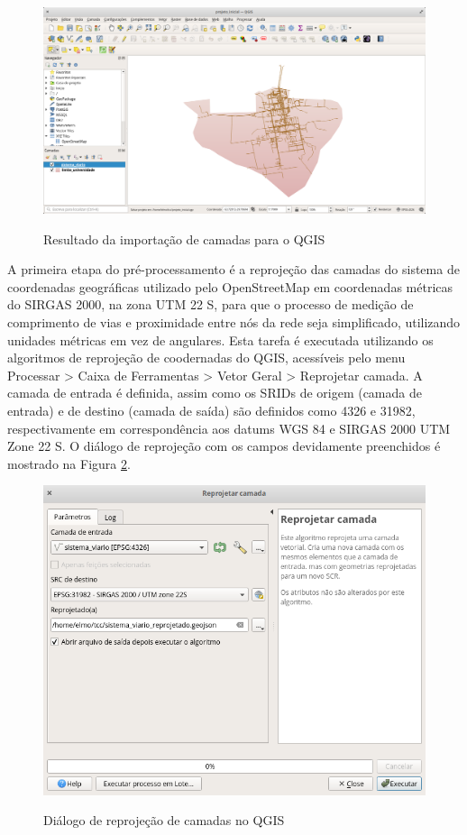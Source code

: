 \documentclass[oneside,openright,12pt]{ufsm_2015} %
\begin{document}
\begin{figure}[h]
    \caption{Resultado da importação de camadas para o QGIS}
    \centering
    \includegraphics[scale=0.3]{imagens/camadas_importadas_qgis.png}
    \label{camadas_importadas_qgis}
\end{figure}

A primeira etapa do pré-processamento é a reprojeção das camadas do sistema de coordenadas geográficas utilizado pelo OpenStreetMap em coordenadas métricas do SIRGAS 2000, na zona UTM 22 S, para que o processo de medição de comprimento de vias e proximidade entre nós da rede seja simplificado, utilizando unidades métricas em vez de angulares. 
Esta tarefa é executada utilizando os algoritmos de reprojeção de coodernadas do QGIS, acessíveis pelo menu Processar > Caixa de Ferramentas > Vetor Geral > Reprojetar camada. 
A camada de entrada é definida, assim como os SRIDs de origem (camada de entrada) e de destino (camada de saída) são definidos como 4326 e 31982, respectivamente em correspondência aos datums WGS 84 e SIRGAS 2000 UTM Zone 22 S. O diálogo de reprojeção com os campos devidamente preenchidos é mostrado na Figura \ref{dialogo_reprojecao}.

\begin{figure}[h]
    \caption{Diálogo de reprojeção de camadas no QGIS}
    \centering
    \includegraphics[scale=0.3]{imagens/dialogo_reprojecao.png}
    \label{dialogo_reprojecao}
\end{figure}
\end{document}
